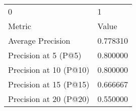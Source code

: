 \begin{tabular}{ll}
0 & 1 \\
Metric & Value \\
Average Precision & 0.778310 \\
Precision at 5 (P@5) & 0.800000 \\
Precision at 10 (P@10) & 0.800000 \\
Precision at 15 (P@15) & 0.666667 \\
Precision at 20 (P@20) & 0.550000 \\
\end{tabular}
